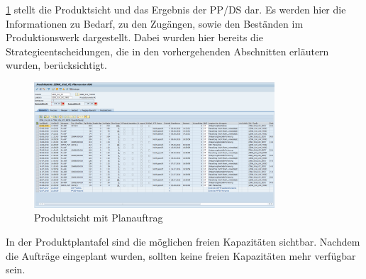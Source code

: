 \ref{fig:pplanung} stellt die Produktsicht und das Ergebnis der \ac{PP/DS} dar. Es werden hier die Informationen zu Bedarf, zu den Zugängen, sowie den Beständen im Produktionswerk dargestellt. Dabei wurden hier bereits die Strategieentscheidungen, die in den vorhergehenden Abschnitten erläutern wurden, berücksichtigt.

\begin{figure}[h]
	\centering
	\includegraphics[width=0.8\textwidth]{../pics/Produktsicht_nko}
	\caption{Produktsicht mit Planauftrag}
	\label{fig:pplanung}
\end{figure}
In der Produktplantafel sind die möglichen freien Kapazitäten sichtbar. Nachdem die Aufträge eingeplant wurden, sollten keine freien Kapazitäten mehr verfügbar sein.


